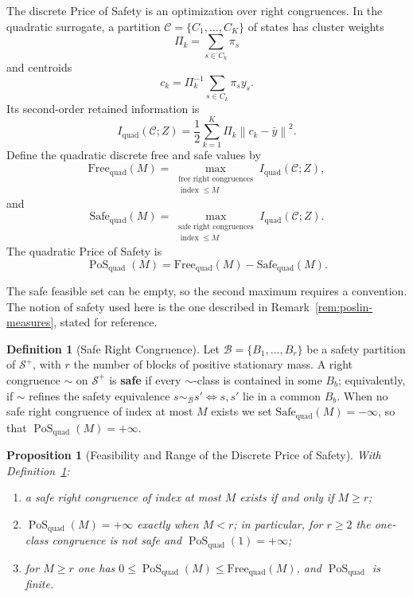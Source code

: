 \documentclass[12pt]{article}
\newtheorem{proposition}[theorem]{Proposition}
\theoremstyle{definition}
\newtheorem{definition}[theorem]{Definition}
\DeclareMathOperator{\PoS}{PoS}
\newcommand{\norm}[1]{\left\lVert#1\right\rVert}
\newcommand{\PoSquad}{\PoS_{\mathrm{quad}}}
\newcommand{\Splus}{\mathcal S^{+}}
\begin{document}
The discrete Price of Safety is an optimization over right congruences.  In
the quadratic surrogate, a partition
$\mathcal C=\{C_1,\dots,C_K\}$ of states has cluster weights
\[
\Pi_k=\sum_{s\in C_k}\pi_s
\]
and centroids
\[
c_k=\Pi_k^{-1}\sum_{s\in C_k}\pi_s y_s.
\]
Its second-order retained information is
\[
I_{\mathrm{quad}}(\mathcal C;Z)
=
\frac12
\sum_{k=1}^K
\Pi_k
\norm{c_k-\bar y}^2.
\]
Define the quadratic discrete free and safe values by
\[
\mathrm{Free}_{\mathrm{quad}}(M)
=
\max_{\substack{
\text{free right congruences}\\
\operatorname{index}\le M
}}
I_{\mathrm{quad}}(\mathcal C;Z),
\]
and
\[
\mathrm{Safe}_{\mathrm{quad}}(M)
=
\max_{\substack{
\text{safe right congruences}\\
\operatorname{index}\le M
}}
I_{\mathrm{quad}}(\mathcal C;Z).
\]
The quadratic Price of Safety is
\[
\PoSquad(M)
=
\mathrm{Free}_{\mathrm{quad}}(M)
-
\mathrm{Safe}_{\mathrm{quad}}(M).
\]

The safe feasible set can be empty, so the second maximum requires a
convention.  The notion of safety used here is the one described in
Remark~\ref{rem:poslin-measures}, stated for reference.

\begin{definition}[Safe Right Congruence]
\label{def:safe-right-cong}
Let $\mathcal B=\{B_1,\dots,B_r\}$ be a safety partition of $\Splus$, with $r$
the number of blocks of positive stationary mass.  A right congruence $\sim$ on
$\Splus$ is \textbf{safe} if every $\sim$-class is contained in some $B_b$;
equivalently, if $\sim$ refines the safety equivalence
$s\sim_{\mathcal B}s'\iff s,s'$ lie in a common $B_b$.  When no safe right
congruence of index at most $M$ exists we set
$\mathrm{Safe}_{\mathrm{quad}}(M)=-\infty$, so that $\PoSquad(M)=+\infty$.
\end{definition}

\begin{proposition}[Feasibility and Range of the Discrete Price of Safety]
\label{prop:pos-quad-consistent}
With Definition~\ref{def:safe-right-cong}:
\begin{enumerate}[label=(\roman*)]
\item a safe right congruence of index at most $M$ exists if and only if
$M\ge r$;
\item $\PoSquad(M)=+\infty$ exactly when $M<r$; in particular, for $r\ge2$ the
one-class congruence is not safe and $\PoSquad(1)=+\infty$;
\item for $M\ge r$ one has
$0\le\PoSquad(M)\le\mathrm{Free}_{\mathrm{quad}}(M)$, and $\PoSquad$ is finite.
\end{enumerate}
\end{proposition}
\end{document}
